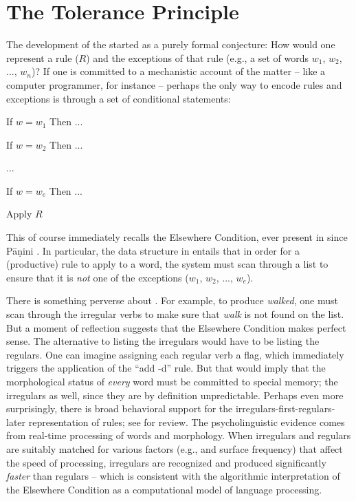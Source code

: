 \documentclass[output=paper,
modfonts
]{LSP/langsci}
\begin{document}
\section{The Tolerance Principle}\label{sec:yang:2}
The development of the  started as a purely formal
conjecture: How 
would one represent a rule ($R$) and the
exceptions of that rule (e.g., a set of words $w_1$, $w_2$, ...,
$w_n$)? If one is committed to a mechanistic account of the
matter -- like a computer programmer, for instance -- perhaps
the only way to encode rules and exceptions is 
through a set of conditional statements: 
\begin{exe}\label{elsewhere} \ex

{ If} $w=w_1$ { Then} ...

{ If} $w=w_2$ { Then} ...

...

{ If} $w=w_e$ { Then} ...

Apply $R$

\end{exe}
\noindent This of course immediately recalls the Elsewhere Condition,
ever present in  since P{\={a}}\d{n}ini
\citep{Anderson1969,  Aronoff1976, Kiparsky1973b, Halle1993}.
In particular,  the data structure in  entails that in
 order for a (productive) rule to apply to a word, the system must
 scan through a list  to ensure that it is \textit{not} one of the
 exceptions ($w_1$, $w_2$, ...,
$w_e$).

There is something perverse about . For
example, to produce \textit{walked}, one  must scan through the irregular
verbs to make sure that \textit{walk} is not found on the list. But a
moment of reflection suggests that the Elsewhere Condition makes perfect
sense. The alternative to listing the irregulars would have to be
listing the regulars. One can imagine assigning each regular verb a
flag,  which immediately triggers the application of the ``add -d'' rule. But
that would imply that the morphological status of  \textit{every} word
 must be committed to special memory;  the irregulars as well, since
 they are by  definition  unpredictable.  Perhaps even more
 surprisingly, there is broad 
 behavioral  support for  the 
irregulars-first-regulars-later representation of rules; see
\citealt[][Chapter 3]{POP} for review. The psycholinguistic evidence
comes from real-time processing of words and morphology. When 
irregulars and regulars are suitably matched for various factors
(e.g.,  and surface frequency) that affect the speed of
processing, irregulars are recognized and produced significantly \emph{faster} than regulars -- which is consistent with the 
algorithmic interpretation of the Elsewhere Condition as a
computational model of 
language processing. 
\end{document}
